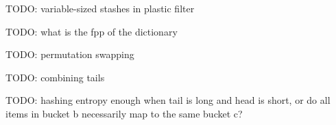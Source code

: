 \documentclass[letterpaper, 11pt]{article}
\begin{document}



TODO: variable-sized stashes in plastic filter

TODO: what is the fpp of the dictionary

TODO: permutation swapping

TODO: combining tails

TODO: hashing entropy enough when tail is long and head is short, or do all items in bucket b necessarily map to the same bucket c?



\end{document}

